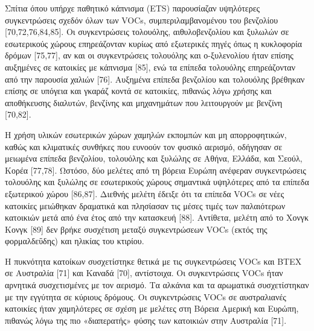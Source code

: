 Σπίτια όπου υπήρχε παθητικό κάπνισμα (ETS) παρουσίαζαν υψηλότερες συγκεντρώσεις σχεδόν όλων των VOCs, συμπεριλαμβανομένου του βενζολίου [70,72,76,84,85]. Οι συγκεντρώσεις τολουόλης, αιθυλοβενζολίου και ξυλωλών σε εσωτερικούς χώρους επηρεάζονταν κυρίως από εξωτερικές πηγές όπως η κυκλοφορία δρόμων [75,77], αν και οι συγκεντρώσεις τολουόλης και ο-ξυλενολίου ήταν επίσης αυξημένες σε κατοικίες με κάπνισμα [85], ενώ τα επίπεδα τολουόλης επηρεάζονταν από την παρουσία χαλιών [76]. Αυξημένα επίπεδα βενζολίου και τολουόλης βρέθηκαν επίσης σε υπόγεια και γκαράζ κοντά σε κατοικίες, πιθανώς λόγω χρήσης και αποθήκευσης διαλυτών, βενζίνης και μηχανημάτων που λειτουργούν με βενζίνη [70,82].

Η χρήση υλικών εσωτερικών χώρων χαμηλών εκπομπών και μη απορροφητικών, καθώς και κλιματικές συνθήκες που ευνοούν τον φυσικό αερισμό, οδήγησαν σε μειωμένα επίπεδα βενζολίου, τολουόλης και ξυλώλης σε Αθήνα, Ελλάδα, και Σεούλ, Κορέα [77,78]. Ωστόσο, δύο μελέτες από τη βόρεια Ευρώπη ανέφεραν συγκεντρώσεις τολουόλης και ξυλώλης σε εσωτερικούς χώρους σημαντικά υψηλότερες από τα επίπεδα εξωτερικού χώρου [86,87]. Διεθνής μελέτη έδειξε ότι τα επίπεδα VOCs σε νέες κατοικίες μειώθηκαν δραματικά και πλησίασαν τις μέσες τιμές των παλαιότερων κατοικιών μετά από ένα έτος από την κατασκευή [88]. Αντίθετα, μελέτη από το Χονγκ Κονγκ [89] δεν βρήκε συσχέτιση μεταξύ συγκεντρώσεων VOCs (εκτός της φορμαλδεΰδης) και ηλικίας του κτιρίου.

Η πυκνότητα κατοίκων συσχετίστηκε θετικά με τις συγκεντρώσεις VOCs και BTEX σε Αυστραλία [71] και Καναδά [70], αντίστοιχα. Οι συγκεντρώσεις VOCs ήταν αρνητικά συσχετισμένες με τον αερισμό. Τα αλκάνια και τα αρωματικά συσχετίστηκαν με την εγγύτητα σε κύριους δρόμους. Οι συγκεντρώσεις VOCs σε αυστραλιανές κατοικίες ήταν χαμηλότερες σε σχέση με μελέτες στη Βόρεια Αμερική και Ευρώπη, πιθανώς λόγω της πιο «διαπερατής» φύσης των κατοικιών στην Αυστραλία [71].

